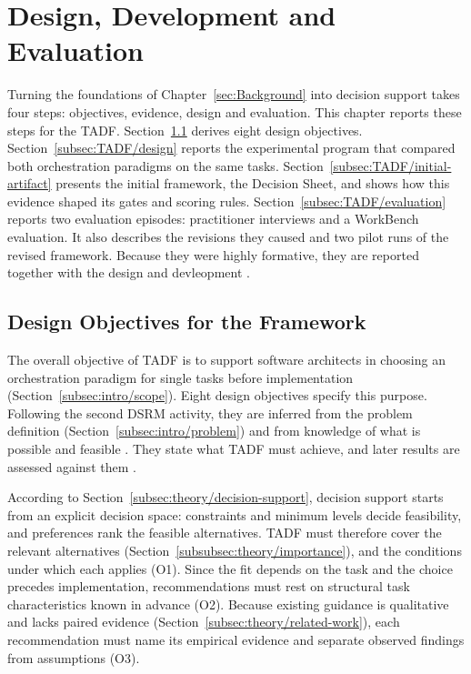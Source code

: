 \clearpage
\section{Design, Development and Evaluation}
\label{sec:TADF/development}
Turning the foundations of Chapter~\ref{sec:Background} into decision support takes four steps: objectives, evidence, design and evaluation. This chapter reports these steps for the TADF.  Section~\ref{subsec:TADF/objectives} derives eight design objectives. Section~\ref{subsec:TADF/design} reports the experimental program that compared both orchestration paradigms on the same tasks. Section~\ref{subsec:TADF/initial-artifact} presents the initial framework, the Decision Sheet, and shows how this evidence shaped its gates and scoring rules. Section~\ref{subsec:TADF/evaluation} reports two evaluation episodes: practitioner interviews and a WorkBench evaluation. It also describes the revisions they caused and two pilot runs of the revised framework. Because they were highly formative, they are reported together with the design and devleopment \parencite{gregorPositioningPresentingDesign2013}.

\subsection{Design Objectives for the Framework}
\label{subsec:TADF/objectives}
The overall objective of TADF is to support software architects in choosing an orchestration paradigm for single tasks before implementation (Section~\ref{subsec:intro/scope}). Eight design objectives specify this purpose. Following the second DSRM activity, they are inferred from the problem definition (Section~\ref{subsec:intro/problem}) and from knowledge of what is possible and feasible \parencite{peffersDesignScienceResearch2007}. They state what TADF must achieve, and later results are assessed against them \parencite{gregorPositioningPresentingDesign2013}.

According to Section~\ref{subsec:theory/decision-support}, decision support starts from an explicit decision space: constraints and minimum levels decide feasibility, and preferences rank the feasible alternatives. TADF must therefore cover the relevant alternatives (Section~\ref{subsubsec:theory/importance}), and the conditions under which each applies (O1). Since the fit depends on the task and the choice precedes implementation, recommendations must rest on structural task characteristics known in advance (O2). Because existing guidance is qualitative and lacks paired evidence (Section~\ref{subsec:theory/related-work}), each recommendation must name its empirical evidence and separate observed findings from assumptions (O3).

